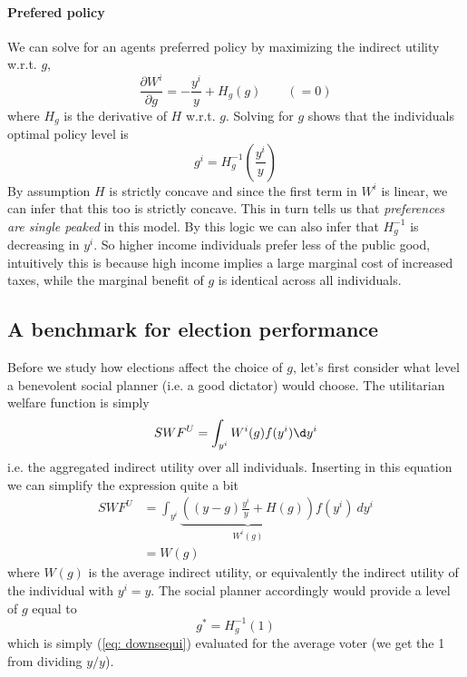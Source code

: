 \paragraph{Prefered policy} We can solve for an agents preferred policy by maximizing the indirect utility w.r.t. $g$, 
\begin{equation}
    \frac{\partial W^i}{\partial g} = -\frac{y^i}{y} + H_g(g) \qquad (=0)
\end{equation}
where $H_g$ is the derivative of $H$ w.r.t. $g$. Solving for $g$ shows that the individuals optimal policy level is 
\begin{equation} \label{eq: downsequi}
    g^i = H_g^{-1}\left( \frac{y^i}{y} \right)
\end{equation}
By assumption $H$ is strictly concave and since the first term in $W^i$ is linear, we can infer that this too is strictly concave. This in turn tells us that \textit{preferences are single peaked} in this model. By this logic we can also infer that $H_g^{-1}$ is decreasing in $y^i$. So higher income individuals prefer less of the public good, intuitively this is because high income implies a large marginal cost of increased taxes, while the marginal benefit of $g$ is identical across all individuals. 

\subsection{A benchmark for election performance}
Before we study how elections affect the choice of $g$, let's first consider what level a benevolent social planner (i.e. a good dictator) would choose. The utilitarian welfare function is simply 
\begin{equation}
    SWF^U = \int_{y^i} W^i(g)f(y^i) \d y^i
\end{equation}
i.e. the aggregated indirect utility over all individuals. Inserting in this equation we can simplify the expression quite a bit 
\begin{equation}
    \begin{split}
        SWF^U &= \int_{y^i} \underbrace{\left( (y-g)\frac{y^i}{y} + H(g)  \right)}_{W^i(g)}f(y^i) \ dy^i \\ 
        &= W(g)
    \end{split}
\end{equation}   
where $W(g)$ is the average indirect utility, or equivalently the indirect utility of the individual with $y^i=y$. The social planner accordingly would provide a level of $g$ equal to 
\begin{equation}
    g^* = H_g^{-1}(1)
\end{equation}
which is simply (\ref{eq: downsequi}) evaluated for the average voter (we get the 1 from dividing $y/y$).

